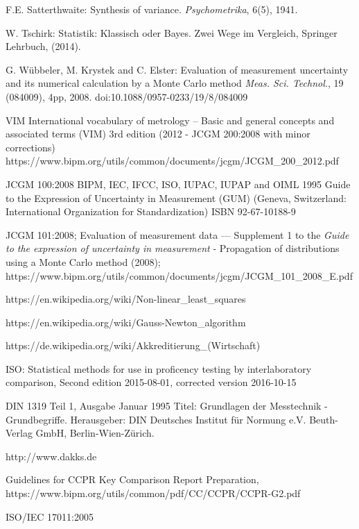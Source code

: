 \documentclass[a4paper,11pt]{book}
\begin{document}
\begin{flushleft}
\begin{thebibliography}{------}
     F.E. Satterthwaite: Synthesis of variance. {\em Psychometrika}, 6(5), 1941.

     W. Tschirk: Statistik: Klassisch oder Bayes. Zwei Wege im Vergleich, Springer Lehrbuch, (2014).

     G. Wübbeler, M. Krystek and C. Elster: Evaluation of measurement uncertainty
    and its numerical calculation by a Monte Carlo method
    {\em Meas. Sci. Technol.}, 19 (084009), 4pp, 2008.
    doi:10.1088/0957-0233/19/8/084009


     VIM International vocabulary of metrology – Basic and general
     concepts and associated terms (VIM) 3rd edition (2012 - JCGM 200:2008 with minor corrections)
     \newline https://www.bipm.org/utils/common/documents/jcgm/JCGM\_200\_2012.pdf

     JCGM 100:2008 BIPM, IEC, IFCC, ISO, IUPAC, IUPAP and OIML 1995 Guide to the Expression of Uncertainty in Measurement (GUM)
    (Geneva, Switzerland: International Organization for
    Standardization) ISBN 92-67-10188-9

    JCGM 101:2008; Evaluation of measurement data — Supplement 1 to the
    \textsl{Guide to the expression of uncertainty in measurement} -
    Propagation of distributions using a Monte Carlo method (2008); \newline
    https://www.bipm.org/utils/common/documents/jcgm/JCGM\_101\_2008\_E.pdf

     https://en.wikipedia.org/wiki/Non-linear\_least\_squares

     https://en.wikipedia.org/wiki/Gauss-Newton\_algorithm

     https://de.wikipedia.org/wiki/Akkreditierung\_(Wirtschaft)

     ISO: Statistical methods for use in proficency testing by interlaboratory comparison, Second edition 2015-08-01, corrected version 2016-10-15

     DIN 1319 Teil 1, Ausgabe Januar 1995 Titel: Grundlagen der Messtechnik - Grundbegriffe. Herausgeber: DIN Deutsches Institut für Normung e.V. Beuth-Verlag GmbH, Berlin-Wien-Zürich.

     http://www.dakks.de

     Guidelines for CCPR Key Comparison Report
    Preparation, https://www.bipm.org/utils/common/pdf/CC/CCPR/CCPR-G2.pdf

    ISO/IEC 17011:2005


\end{thebibliography}
\end{flushleft}
\end{document}
